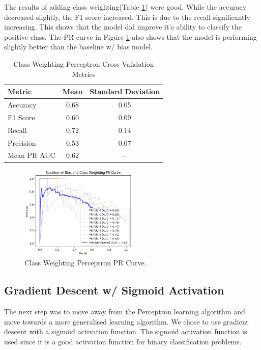 The results of adding class weighting(Table \ref{tab:weight_metrics}) were good. While the accuracy decreased slightly, the F1 score increased. This is due to the recall significantly increasing. This shows that the model did improve it's ability  to classify the positive class. The PR curve in Figure \ref{fig:weight_pr} also shows that the model is performing slightly better than the baseline w/ bias model.

\begin{table}[ht!]
    \centering
    \begin{tabular}{lcc}
        \toprule
        \textbf{Metric} & \textbf{Mean} & \textbf{Standard Deviation} \\
        \midrule
        Accuracy & 0.68 & 0.05 \\
        F1 Score & 0.60 & 0.09 \\
        Recall & 0.72 & 0.14 \\
        Precision & 0.53 & 0.07 \\
        Mean PR AUC & 0.62 & - \\
        \bottomrule
    \end{tabular}
    \caption{Class Weighting Perceptron Cross-Validation Metrics}
    \label{tab:weight_metrics}
\end{table}

\begin{figure}[ht!]
    \centering
    \includegraphics[width=0.5\textwidth]{images/class_weighting_pr.png}
    \caption{Class Weighting Perceptron PR Curve.}
    \label{fig:weight_pr}
\end{figure}

\subsection{Gradient Descent w/ Sigmoid Activation}

The next step was to move away from the Perceptron learning algorithm and move towards a more generalised learning algorithm. We chose to use gradient descent with a sigmoid activation function. The sigmoid activation function is used since it is a good activation function for binary classification problems. 

